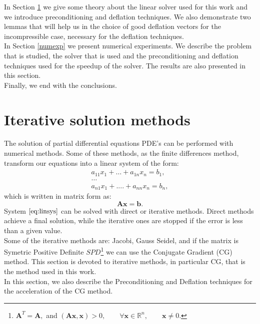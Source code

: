 \documentclass[12pt]{article}
\begin{document}
 In Section \ref{syseq} we give some theory about the linear solver used for this work and we introduce preconditioning and deflation techniques. We also demonstrate two lemmas that will help us in the choice of good deflation vectors for the incompressible case, necessary for the deflation techniques.\\
 In Section \ref{numexp} we present numerical experiments. We describe the problem that is studied, the solver that is used and the preconditioning and deflation techniques used for the speedup of the solver. The results are also presented in this section. \\
 Finally, we end with the conclusions.
\newpage
\section{Iterative solution methods}\label{syseq}
The solution of partial differential equations PDE's 
can be performed with numerical methods. Some of these methods, as the finite differences method, 
transform our equations into a linear 
system of the form:
\begin{gather*}
a_{11}x_{1}+\dots+a_{1n}x_{n}=b_{1},\\
\dots\\
a_{n1}x_{1}+....+a_{nn}x_{n}=b_{n},
\end{gather*}
which is written in matrix form as:
\begin{equation}\label{eq:linsys}
 \mathbf{A}\mathbf{x}=\mathbf{b}.
\end{equation}
System $\eqref{eq:linsys}$ can be solved with direct or iterative methods. Direct methods achieve a final solution, 
while the iterative ones
are stopped if the error is less than a given value. \\
Some of the iterative methods are: Jacobi, Gauss Seidel, and if the
matrix is Symetric Positive Definite $SPD$\footnote{$\mathbf{A}^T=\mathbf{A},$ and $(\mathbf{A}\mathbf{x},\mathbf{x})>0, \qquad \forall \mathbf{x} \in \mathbb{R}^n, \qquad \mathbf{x}\neq0.$} we can use the Conjugate Gradient (CG) method.
This section is devoted to iterative methods, in particular CG, that is the
method used in this work. \\
In this section, we also describe the Preconditioning and Deflation techniques 
for the acceleration of the CG method.
\end{document}
